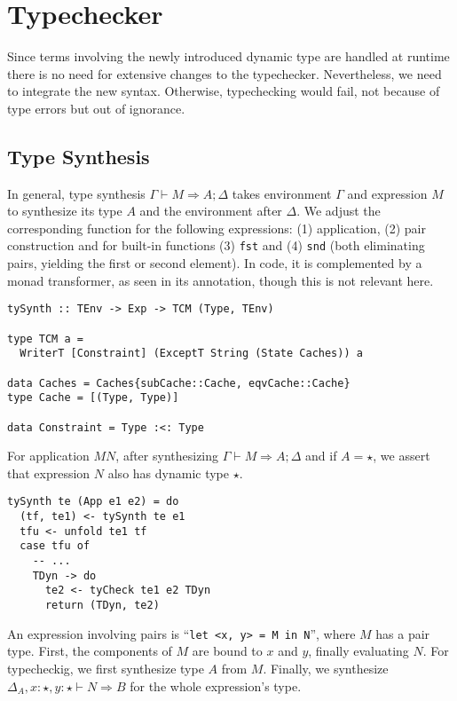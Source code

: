 \section{Typechecker}

Since terms involving the newly introduced dynamic type are handled at runtime there is no need for extensive changes to the typechecker. Nevertheless, we need to integrate the new syntax. Otherwise, typechecking would fail, not because of type errors but out of ignorance.

\subsection{Type Synthesis}

In general, type synthesis $\Gamma \vdash M \Rightarrow A;\Delta$ takes environment $\Gamma$ and expression $M$ to synthesize its type $A$ and the environment after $\Delta$. We adjust the corresponding function for the following expressions: (1) application, (2) pair construction and for built-in functions (3) \texttt{fst} and (4) \texttt{snd} (both eliminating pairs, yielding the first or second element). In code, it is complemented by a monad transformer, as seen in its annotation, though this is not relevant here.

\begin{lstlisting}[caption=\texttt{tySynth} function type annotation]
tySynth :: TEnv -> Exp -> TCM (Type, TEnv)

type TCM a =
  WriterT [Constraint] (ExceptT String (State Caches)) a

data Caches = Caches{subCache::Cache, eqvCache::Cache}
type Cache = [(Type, Type)]

data Constraint = Type :<: Type
\end{lstlisting}

For application $M N$, after synthesizing $\Gamma \vdash M \Rightarrow A;\Delta$ and if $A = \star$, we assert that expression $N$ also has dynamic type $\star$.

\begin{lstlisting}[caption=TCTyping.hs]
tySynth te (App e1 e2) = do
  (tf, te1) <- tySynth te e1
  tfu <- unfold te1 tf
  case tfu of
    -- ...
    TDyn -> do
      te2 <- tyCheck te1 e2 TDyn
      return (TDyn, te2)
\end{lstlisting}

An expression involving pairs is ``\lstinline[language=ldgv]!let <x, y> = M in N!'', where $M$ has a pair type. First, the components of $M$ are bound to $x$ and $y$, finally evaluating $N$. For typecheckig, we first synthesize type $A$ from $M$. Finally, we synthesize $\Delta_A, x:\star, y:\star \vdash N \Rightarrow B$ for the whole expression's type.

